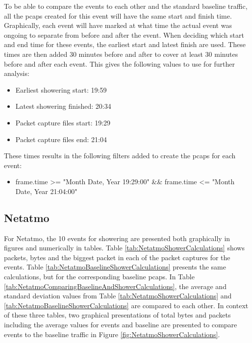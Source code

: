 To be able to compare the events to each other and the standard baseline traffic, all the pcaps created for this event will have the same start and finish time. Graphically, each event will have marked at what time the actual event was ongoing to separate from before and after the event. When deciding which start and end time for these events, the earliest start and latest finish are used. These times are then added 30 minutes before and after to cover at least 30 minutes before and after each event. This gives the following values to use for further analysis:

\begin{itemize}
    \item Earliest showering start: 19:59
    \item Latest showering finished: 20:34
    \item Packet capture files start: 19:29
    \item Packet capture files end: 21:04
\end{itemize}

These times results in the following filters added to create the pcaps for each event:
\begin{itemize}
    \item frame.time >= "Month Date, Year 19:29:00" \&\& frame.time <= "Month Date, Year 21:04:00"
\end{itemize}

\newpage
\subsection{Netatmo}
For Netatmo, the 10 events for showering are presented both graphically in figures and numerically in tables. Table \ref{tab:NetatmoShowerCalculations} shows packets, bytes and the biggest packet in each of the packet captures for the events. Table \ref{tab:NetatmoBaselineShowerCalculations} presents the same calculations, but for the corresponding baseline pcaps. In Table \ref{tab:NetatmoComparingBaselineAndShowerCalculations}, the average and standard deviation values from Table \ref{tab:NetatmoShowerCalculations} and \ref{tab:NetatmoBaselineShowerCalculations} are compared to each other. In context of these three tables, two graphical presentations of total bytes and packets including the average values for events and baseline are presented to compare events to the baseline traffic in Figure \ref{fig:NetatmoShowerCalculations}. 

